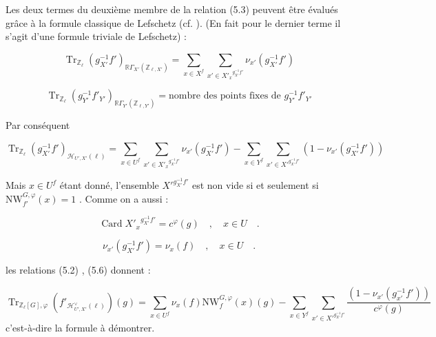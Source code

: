\documentclass[11pt]{article}
\newcommand{\R}{\mathbb{R}}\newcommand{\RHomCore}{\mathbb{R}\mathrm{Hom}}
\providecommand{\Tr}{\operatorname{Tr}}
\providecommand{\Tr}{\operatorname{Tr}}
\providecommand{\Tr}{\operatorname{Tr}}
\providecommand{\R}{\mathrm R}
\providecommand{\Tr}{\operatorname{Tr}}
\providecommand{\bZ}{\mathbb Z}
\providecommand{\Tr}{\operatorname{Tr}}
\begin{document}
Les deux termes du deuxième membre de la relation (5.3) peuvent être évalués grâce à la formule classique de Lefschetz (cf. ). (En fait pour le dernier terme il s'agit d'une formule triviale de Lefschetz) :

\begin{equation}\tag{5.4}
\Tr_{\bZ_\ell}(g_{X'}^{-1}f')_{\R\Gamma_{X'}(\bZ_{\ell,X'})} = \sum_{x \in X^f} \sum_{x' \in {X'_x}^{g_{X'}^{-1}f'}} \nu_{x'}(g_{X'}^{-1}f')
\end{equation}

\begin{equation}\tag{5.5}
\Tr_{\bZ_\ell}(g_{Y'}^{-1}f'_{Y'})_{\R\Gamma_{Y'}(\bZ_{\ell,Y'})} = \text{nombre des points fixes de } g_{Y'}^{-1}f'_{Y'}
\end{equation}

Par conséquent

\begin{equation}\tag{5.6}
\Tr_{\bZ_\ell}(g_{X'}^{-1}f')_{\mathcal{H}_{U',X'}(\ell)} = \sum_{x \in U^f} \sum_{x' \in {X'_x}^{g_{X'}^{-1}f'}} \nu_{x'}(g_{X'}^{-1}f') - \sum_{x \in Y^f} \sum_{x' \in {X'}^{g_{X'}^{-1}f'}} (1 - \nu_{x'}(g_{X'}^{-1}f'))
\end{equation}

Mais $x \in U^f$ étant donné, l'ensemble ${X'}^{g_{X'}^{-1}f'}$ est non vide si et seulement si $\mathrm{NW}_{f'}^{G,\varphi}(x) = 1$ . Comme on a aussi :

\begin{equation}\tag{5.7}
\operatorname{Card} {X'_x}^{g_{X'}^{-1}f'} = c^\varphi(g) \quad , \quad x \in U \quad .
\end{equation}

\begin{equation}\tag{5.8}
\nu_{x'}(g_{X'}^{-1}f') = \nu_x(f) \quad , \quad x \in U \quad .
\end{equation}

les relations (5.2) , (5.6) donnent :

\begin{equation}\tag{5.9}
\Tr_{\bZ_\ell[G],\varphi}(f'_{\mathcal{H}^\vee_{U',X'}(\ell)})(g) = \sum_{x \in U^f} \nu_x(f) \mathrm{NW}_f^{G,\varphi}(x)(g) - \sum_{x \in Y^f} \sum_{x' \in {X'}^{g_{X'}^{-1}f'}} \frac{(1 - \nu_{x'}(g_{x'}^{-1}f'))}{c^\varphi(g)}
\end{equation}
c'est-à-dire la formule à démontrer.
\end{document}
